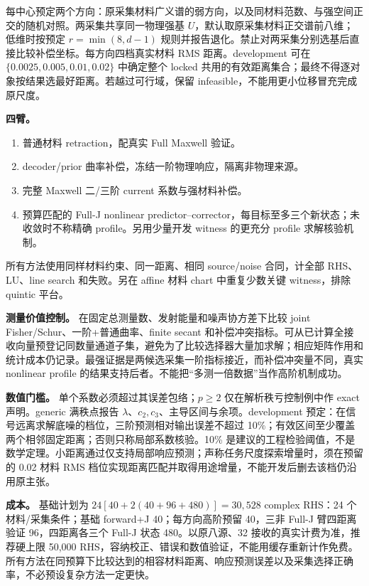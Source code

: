 每中心预定两个方向：原采集材料广义谱的弱方向，以及同材料范数、与强空间正交的随机对照。两采集共享同一物理强基 $U$，默认取原采集材料正交谱前八维；低维时按预定 $r=\min(8,d-1)$ 规则并报告退化。禁止对两采集分别选基后直接比较补偿坐标。每方向四档真实材料 RMS 距离。development 可在 $\{0.0025,0.005,0.01,0.02\}$ 中确定整个 locked 共用的有效距离集合；最终不得逐对象按结果选最好距离。若越过可行域，保留 infeasible，不能用更小位移冒充完成原尺度。

\textbf{四臂。}
\begin{enumerate}
\item 普通材料 retraction，配真实 Full Maxwell 验证。
\item decoder/prior 曲率补偿，冻结一阶物理响应，隔离非物理来源。
\item 完整 Maxwell 二/三阶 current 系数与强材料补偿。
\item 预算匹配的 Full-J nonlinear predictor--corrector，每目标至多三个新状态；未收敛时不称精确 profile。另用少量开发 witness 的更充分 profile 求解核验机制。
\end{enumerate}
所有方法使用同样材料约束、同一距离、相同 source/noise 合同，计全部 RHS、LU、line search 和失败。另在 affine 材料 chart 中重复少数关键 witness，排除 quintic 平台。

\textbf{测量价值控制。} 在固定总测量数、发射能量和噪声协方差下比较 joint Fisher/Schur、一阶+普通曲率、finite secant 和补偿冲突指标。可从已计算全接收向量预登记同数量通道子集，避免为了比较选择器大量加求解；相应矩阵作用和统计成本仍记录。最强证据是两候选采集一阶指标接近，而补偿冲突量不同，真实 nonlinear profile 的结果支持后者。不能把“多测一倍数据”当作高阶机制成功。

\textbf{数值门槛。} 单个系数必须超过其误差包络；$p\ge2$ 仅在解析秩亏控制例中作 exact 声明。generic 满秩点报告 $\lambda$、$c_2,c_3$、主导区间与余项。development 预定：在信号远离求解底噪的档位，三阶预测相对输出误差不超过 10\%；有效区间至少覆盖两个相邻固定距离；否则只称局部系数核验。10\% 是建议的工程检验阈值，不是数学定理。小距离通过仅支持局部响应预测；声称任务尺度探索增量时，须在预留的 0.02 材料 RMS 档位实现距离匹配并取得用途增量，不能开发后删去该档仍沿用原主张。

\textbf{成本。} 基础计划为 $24[40+2(40+96+480)]=30{,}528$ complex RHS：24 个材料/采集条件；基础 forward+J 40；每方向高阶预留 40，三非 Full-J 臂四距离验证 96，四距离各三个 Full-J 状态 480。以原八源、32 接收的真实计费为准，推荐硬上限 50,000 RHS，容纳校正、错误和数值验证，不能用缓存重新计作免费。所有方法在同预算下比较达到的相容材料距离、响应预测误差以及采集选择正确率，不必预设复杂方法一定更快。

